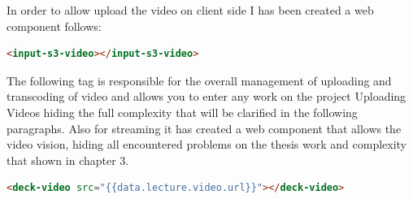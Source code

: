 In order to allow upload the video on client side I has been created a web component follows:

\begin{lstlisting}[language=html]
      <input-s3-video></input-s3-video>
\end{lstlisting}

The following tag is responsible for the overall management of uploading and transcoding of video and allows you to enter any work on the project Uploading Videos hiding the full complexity that will be clarified in the following paragraphs.
Also for streaming it has created a web component that allows the video vision, hiding all  encountered problems on the thesis work and complexity that shown in chapter 3.

\begin{lstlisting}[language=html]
       <deck-video src="{{data.lecture.video.url}}"></deck-video>
\end{lstlisting}